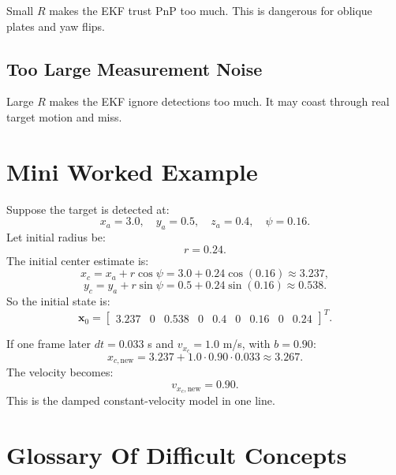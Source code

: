 \documentclass[11pt,a4paper]{article}
\newcommand{\vect}[1]{\bm{#1}}
\begin{document}
Small \(R\) makes the EKF trust PnP too much.
This is dangerous for oblique plates and yaw flips.

\subsection{Too Large Measurement Noise}

Large \(R\) makes the EKF ignore detections too much.
It may coast through real target motion and miss.

\section{Mini Worked Example}

Suppose the target is detected at:
\[
  x_a=3.0,\quad y_a=0.5,\quad z_a=0.4,\quad \psi=0.16.
\]
Let initial radius be:
\[
  r=0.24.
\]
The initial center estimate is:
\[
  x_c=x_a+r\cos\psi
  =3.0+0.24\cos(0.16)
  \approx 3.237,
\]
\[
  y_c=y_a+r\sin\psi
  =0.5+0.24\sin(0.16)
  \approx 0.538.
\]
So the initial state is:
\[
\vect{x}_0=
\begin{bmatrix}
3.237&0&0.538&0&0.4&0&0.16&0&0.24
\end{bmatrix}^{T}.
\]

If one frame later \(dt=0.033\) s and \(v_{x_c}=1.0\) m/s, with \(b=0.90\):
\[
  x_{c,\text{new}} = 3.237 + 1.0\cdot0.90\cdot0.033
  \approx 3.267.
\]
The velocity becomes:
\[
  v_{x_c,\text{new}}=0.90.
\]
This is the damped constant-velocity model in one line.

\section{Glossary Of Difficult Concepts}
\end{document}
